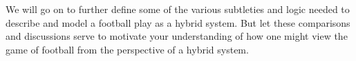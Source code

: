 We will go on to further define some of the various subtleties and logic needed to describe and model a football play as a hybrid system. But let these comparisons and discussions serve to motivate your understanding of how one might view the game of football from the perspective of a hybrid system.
